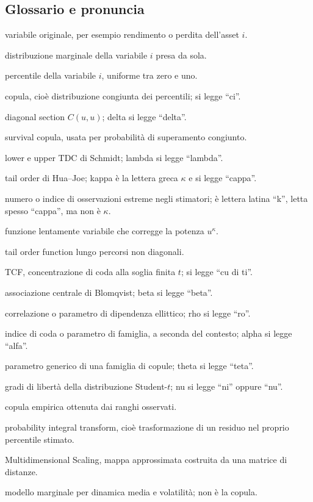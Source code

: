 \documentclass[11pt,a4paper]{article}
\begin{document}
\subsection{Glossario e pronuncia}

\begin{description}[leftmargin=4.0cm,style=nextline]
  \item[$X_i$] variabile originale, per esempio rendimento o perdita dell'asset
  $i$.
  \item[$F_i$] distribuzione marginale della variabile $i$ presa da sola.
  \item[$U_i=F_i(X_i)$] percentile della variabile $i$, uniforme tra zero e uno.
  \item[$C$] copula, cioè distribuzione congiunta dei percentili; si legge
  ``ci''.
  \item[$\delta_C(u)$] diagonal section $C(u,u)$; delta si legge ``delta''.
  \item[$\overline C$] survival copula, usata per probabilità di superamento
  congiunto.
  \item[$\lambda_L,\lambda_U$] lower e upper TDC di Schmidt; lambda si legge
  ``lambda''.
  \item[$\kappa_L,\kappa_U$] tail order di Hua--Joe; kappa è la lettera greca
  $\kappa$ e si legge ``cappa''.
  \item[$k$] numero o indice di osservazioni estreme negli stimatori; è lettera
  latina ``k'', letta spesso ``cappa'', ma non è $\kappa$.
  \item[$\ell(u)$] funzione lentamente variabile che corregge la potenza
  $u^\kappa$.
  \item[$b(w)$] tail order function lungo percorsi non diagonali.
  \item[$q_C(t)$] TCF, concentrazione di coda alla soglia finita $t$; si legge
  ``cu di ti''.
  \item[$\beta_C$] associazione centrale di Blomqvist; beta si legge ``beta''.
  \item[$\rho$] correlazione o parametro di dipendenza ellittico; rho si legge
  ``ro''.
  \item[$\alpha$] indice di coda o parametro di famiglia, a seconda del
  contesto; alpha si legge ``alfa''.
  \item[$\theta$] parametro generico di una famiglia di copule; theta si legge
  ``teta''.
  \item[$\nu$] gradi di libertà della distribuzione Student-$t$; nu si legge
  ``ni'' oppure ``nu''.
  \item[$C_n$] copula empirica ottenuta dai ranghi osservati.
  \item[PIT] probability integral transform, cioè trasformazione di un residuo
  nel proprio percentile stimato.
  \item[MDS] Multidimensional Scaling, mappa approssimata costruita da una
  matrice di distanze.
  \item[ARMA--GARCH] modello marginale per dinamica media e volatilità; non è
  la copula.
\end{description}
\end{document}
